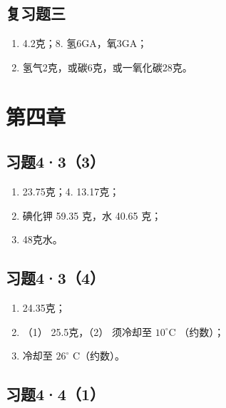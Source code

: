 \subsection{复习题三}

\begin{enumerate}[start=6]
\item
  4.2克；8. 氢6GA，氧3GA；
\item
  氢气2克，或碳6克，或一氧化碳28克。
\end{enumerate}

\begin{figure}
\centering
\end{figure}

\section{第四章}

\subsection{习题4·3（3）}

\begin{enumerate}[start=3]
\item
  23.75克；4. 13.17克；
\item
  碘化钾 59.35 克，水 40.65 克；
\item
  48克水。
\end{enumerate}

\subsection{习题4·3（4）}

\begin{enumerate}[start=4]
\item
  24.35克；
\item
  （1） 25.5克，（2） 须冷却至 \(10^{\circ} \mathrm{C}\) （约数）；
\item
  冷却至 \(26^{\circ}\) C（约数）。
\end{enumerate}

\subsection{习题4·4（1）}

